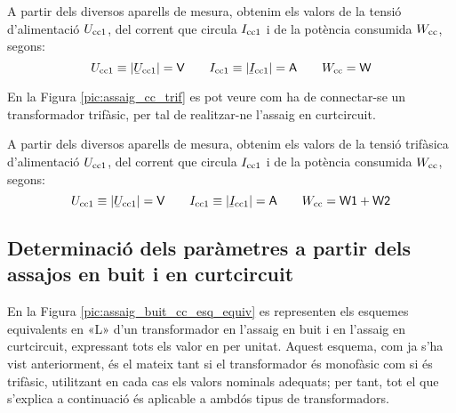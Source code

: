 A partir dels diversos aparells de mesura, obtenim els valors de la
tensió d'alimentació $U_\mathrm{cc1}$, del corrent que circula
$I_\mathrm{cc1}$ i de la potència consumida $W_\mathrm{cc}$, segons:
\begin{equation}
    U\ped{cc1}\equiv|\cmplx{U}\ped{cc1}|=\textsf{V} \qquad
    I\ped{cc1}\equiv|\cmplx{I}\ped{cc1}|=\textsf{A}
     \qquad W\ped{cc}=\textsf{W}
\end{equation}

En la Figura \vref{pic:assaig_cc_trif} es pot veure com ha de
connectar-se un transformador trifàsic, per tal de realitzar-ne l'assaig en curtcircuit.

\begin{center}
    
    \label{pic:assaig_cc_trif}
\end{center}


A partir dels diversos aparells de mesura, obtenim els valors de la
tensió trifàsica d'alimentació $U_\mathrm{cc1}$, del corrent que circula
$I_\mathrm{cc1}$ i de la potència consumida $W_\mathrm{cc}$, segons:
\begin{equation}
    U\ped{cc1}\equiv|\cmplx{U}\ped{cc1}|=\textsf{V} \qquad
    I\ped{cc1}\equiv|\cmplx{I}\ped{cc1}|=\textsf{A} \qquad
    W\ped{cc}=\textsf{W1}+\textsf{W2}
\end{equation}

\subsection{Determinació dels paràmetres a partir dels assajos en buit i en curtcircuit}

En la Figura \vref{pic:assaig_buit_cc_esq_equiv}  es representen els
esquemes equivalents en «L» d'un transformador en l'assaig en buit i
en l'assaig en curtcircuit, expressant tots els valor en per unitat.
Aquest esquema, com ja s'ha vist anteriorment, és el mateix tant si
el transformador és monofàsic com si és trifàsic, utilitzant en cada
cas els valors nominals adequats; per tant, tot el que s'explica  a
continuació és aplicable a ambdós tipus de transformadors.

\begin{center}
    
     \label{pic:assaig_buit_cc_esq_equiv}
\end{center}

